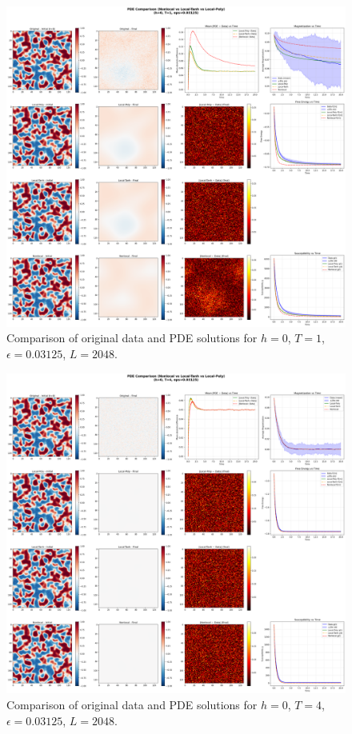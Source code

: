 \documentclass[11pt,a4paper]{article}
\begin{document}

\begin{figure}[!h]
    \centering
    \includegraphics[width=1.0\textwidth]{fig/compare_pde_solvers_L2048_h0_T1_eps0.03125.png}
    \caption{Comparison of original data and PDE solutions for $h=0$, $T=1$, $\epsilon=0.03125$, $L=2048$.}
    \label{fig:pde_comparison_h0_T1_eps0.03125_L2048}
\end{figure}


\begin{figure}[h]
    \centering
    \includegraphics[width=1.0\textwidth]{fig/compare_pde_solvers_L2048_h0_T4_eps0.03125.png}
    \caption{Comparison of original data and PDE solutions for $h=0$, $T=4$, $\epsilon=0.03125$, $L=2048$.}
    \label{fig:pde_comparison_h0_T4_eps0.03125_L2048}
\end{figure}
\end{document}
